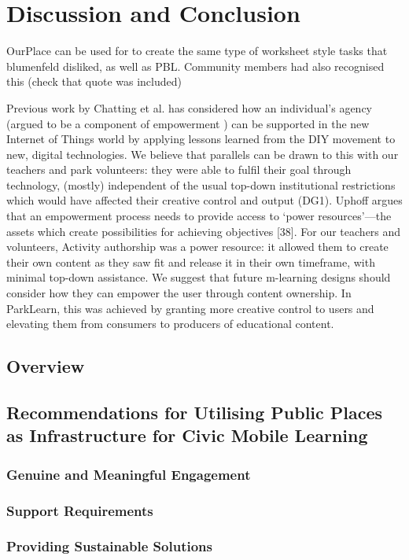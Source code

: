 \chapter{Discussion and Conclusion}

OurPlace can be used for to create the same type of worksheet style tasks that blumenfeld disliked, as well as PBL. Community members had also recognised this (check that quote was included) 

Previous work by Chatting et al. \citep{Chatting2017} has considered how an individual’s agency (argued to be a component of empowerment \citep{Ibrahim2007}) can be supported in the new Internet of Things world by applying lessons learned from the DIY movement to new, digital technologies. We believe that parallels can be drawn to this with our teachers and park volunteers: they were able to fulfil their goal through technology, (mostly) independent of the usual top-down institutional restrictions which would have affected their creative control and output (DG1). Uphoff argues that an empowerment process needs to provide access to ‘power resources’—the assets which create possibilities for achieving objectives [38]. For our teachers and volunteers, Activity authorship was a power resource: it allowed them to create their own content as they saw fit and release it in their own timeframe, with minimal top-down assistance. We suggest that future m-learning designs should consider how they can empower the user through content ownership. In ParkLearn, this was achieved by granting more creative control to users and elevating them from consumers to producers of educational content.

\section{Overview}

\section{Recommendations for Utilising Public Places as Infrastructure for Civic Mobile Learning}

\subsection{Genuine and Meaningful Engagement}
\subsection{Support Requirements}
\subsection{Providing Sustainable Solutions}